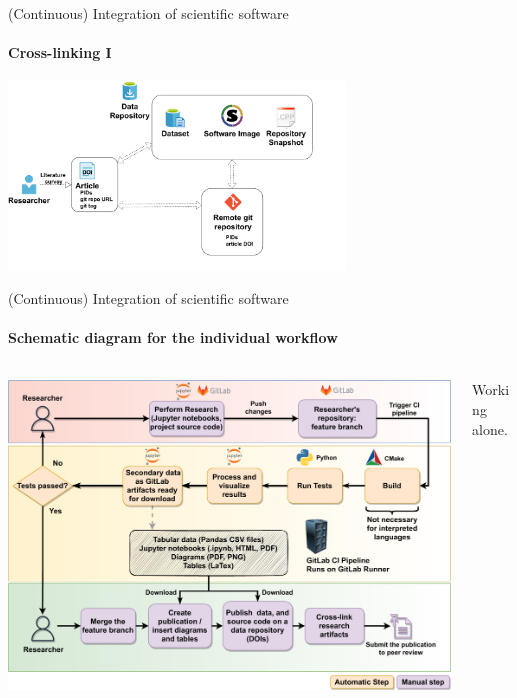 \begin{frame}{(Continuous) Integration of scientific software} 
\framesubtitle{Cross-linking I}
\vfill

    \begin{center}
            \includegraphics[width=0.67\textwidth]{figures/cross-linking.pdf}
    \end{center}

\end{frame}

\begin{frame}{(Continuous) Integration of scientific software} 
	\framesubtitle{Schematic diagram for the individual workflow}
        \vfill

        \centering

        \begin{columns}
            \begin{column}[c]{0.55\textwidth}
                \includegraphics[width=\columnwidth]{figures/ZINF-CI-diagram-individual.pdf}
            \end{column}
            \begin{column}[c]{0.20\textwidth}
                Working alone. 
            \end{column}
        \end{columns}
\end{frame}

